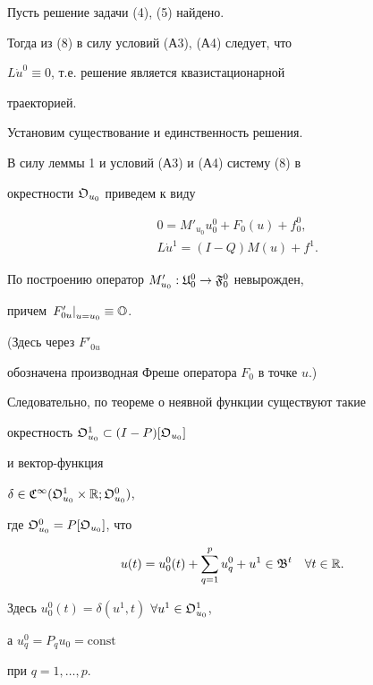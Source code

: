 \begin{pf} Пусть решение задачи (4), (5) найдено.


Тогда из (8) в силу условий (А3), (А4) следует, что


$L\Dot u^0\equiv0$, т.е. решение является квазистационарной


траекторией.


Установим существование и единственность решения.


В силу леммы 1 и условий (А3) и (А4) систему (8) в


окрестности $\frak O_{u_0}$ приведем к виду


\begin{equation}


\begin{split}


&0=M'_{u_0}u^0_0+F_0(u)+f^0_0,\\


&L\Dot u^1= (I-Q)M(u)+f^1.


\end{split}


\end{equation}


По построению оператор $M'_{u_0}:\frak U^0_0\to\frak F^0_0$ невырожден,


причем $\left.F'_{0u}\right|_{u=u_0}\equiv\Bbb O$.


(Здесь через $F'_{0u}$


обозначена производная Фреше оператора $F_0$ в точке $u$.)


Следовательно, по теореме о неявной функции существуют такие


окрестность $\frak O^1_{u_0}\subset(I-P)[\frak O_{u_0}]$


и вектор-функция


$\delta\in\frak C^\infty(\frak O^1_{u_0}\times\Bbb R;


\frak O^0_{u_0})$,


где $\frak O^0_{u_0}=P[\frak O_{u_0}]$, что


$$


u(t)=u^0_0(t)+\sum^p_{q=1}u^0_q+u^1\in\frak B^t\quad


\forall t\in\Bbb R.


$$


Здесь $u^0_0(t)=\delta(u^1,t)$ $\forall


u^1\in\frak O^1_{u_0}$,


а $u^0_q=P_qu_0=\text{const}$


при $q=1,\dotsc,p$.






\end{pf}
